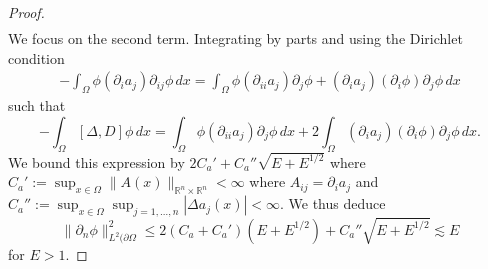 \documentclass{article}
\newcommand{\R}{\mathbb{R}}
\begin{document}
\begin{proof}
\begin{align*}
\end{align*}
We focus on the second term. Integrating by parts and using the Dirichlet condition
\begin{align*}
- \int_{\Omega} \phi (\partial_i a_j) \partial_{ij} \phi \, dx = \int_{\Omega} \phi (\partial_{ii} a_j)\partial_j \phi + (\partial_i a_j)(\partial_i \phi)\partial_j \phi \, dx
\end{align*}
such that
\begin{equation}
\label{eq-28}
- \int_{\Omega} [\Delta, D] \phi \, dx = \int_{\Omega} \phi (\partial_{ii} a_j)\partial_j \phi \, dx + 2 \int_{\Omega} (\partial_i a_j)(\partial_i \phi)\partial_j \phi \, dx.
\end{equation}
We bound this expression by $2 C_a' + C_a'' \sqrt{E + E^{1/2}}$ where $C_a' := \sup_{x \in \Omega} \lVert A(x) \rVert_{\R^n \times \R^n} < \infty$ where $A_{ij} = \partial_i a_j$ and $C_a'' := \sup_{x \in \Omega} \sup_{j=1,\dots,n} |\Delta a_j (x)| < \infty$.
We thus deduce
\[
\lVert \partial_n \phi \rVert_{L^2(\partial \Omega}^2 \le 2 (C_a + C_a') (E + E^{1/2}) + C_a'' \sqrt{E + E^{1/2}} \lesssim E
\]
for $E > 1$.
\end{proof}
\end{document}
